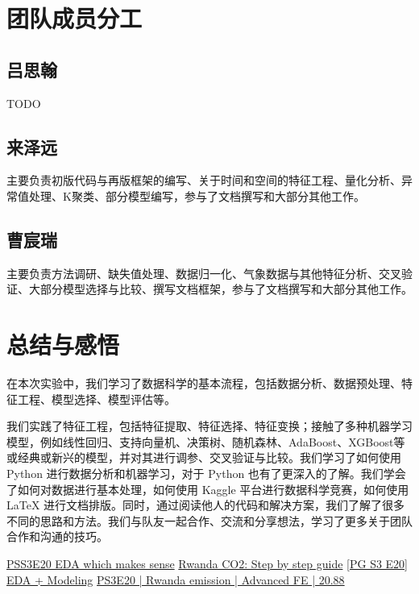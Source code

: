 \documentclass{ctexart}
\begin{document}
\section{团队成员分工}

\subsection{吕思翰}

TODO

\subsection{来泽远}

主要负责初版代码与再版框架的编写、关于时间和空间的特征工程、量化分析、异常值处理、K聚类、部分模型编写，参与了文档撰写和大部分其他工作。

\subsection{曹宸瑞}

主要负责方法调研、缺失值处理、数据归一化、气象数据与其他特征分析、交叉验证、大部分模型选择与比较、撰写文档框架，参与了文档撰写和大部分其他工作。

\section{总结与感悟}

在本次实验中，我们学习了数据科学的基本流程，包括数据分析、数据预处理、特征工程、模型选择、模型评估等。

我们实践了特征工程，包括特征提取、特征选择、特征变换；接触了多种机器学习模型，例如线性回归、支持向量机、决策树、随机森林、AdaBoost、XGBoost等或经典或新兴的模型，并对其进行调参、交叉验证与比较。我们学习了如何使用 Python 进行数据分析和机器学习，对于 Python 也有了更深入的了解。我们学会了如何对数据进行基本处理，如何使用 Kaggle 平台进行数据科学竞赛，如何使用 \LaTeX{} 进行文档排版。同时，通过阅读他人的代码和解决方案，我们了解了很多不同的思路和方法。我们与队友一起合作、交流和分享想法，学习了更多关于团队合作和沟通的技巧。

\begin{thebibliography}{100}
      \href{https://www.kaggle.com/code/ambrosm/pss3e20-eda-which-makes-sense}{PSS3E20 EDA which makes sense}
      \href{https://www.kaggle.com/code/kacperrabczewski/rwanda-co2-step-by-step-guide}{Rwanda CO2: Step by step guide}
      \href{https://www.kaggle.com/code/yaaangzhou/pg-s3-e20-eda-modeling}{[PG S3 E20] EDA + Modeling}
      \href{https://www.kaggle.com/code/dmitryuarov/ps3e20-rwanda-emission-advanced-fe-20-88}{PS3E20 | Rwanda emission | Advanced FE | 20.88}
\end{thebibliography}
\end{document}
